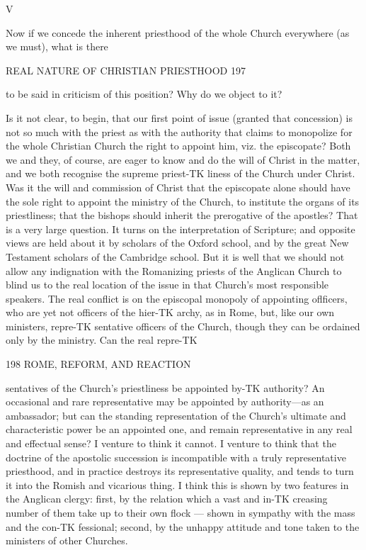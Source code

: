 \documentclass[12pt,a5paper,oneside]{book}
\begin{document}
{V 

Now if we concede the inherent priesthood of the 
whole Church everywhere (as we must), what is there 



REAL NATURE OF CHRISTIAN PRIESTHOOD 197 

to be said in criticism of this position? Why do 
we object to it? 

Is it not clear, to begin, that our first point of 
issue (granted that concession) is not so much with the 
priest as with the authority that claims to monopolize 
for the whole Christian Church the right to appoint 
him, viz. the episcopate? Both we and they, of 
course, are eager to know and do the will of Christ in 
the matter, and we both recognise the supreme priest-TK
liness of the Church under Christ. Was it the will 
and commission of Christ that the episcopate alone 
should have the sole right to appoint the ministry of 
the Church, to institute the organs of its priestliness; 
that the bishops should inherit the prerogative of the 
apostles? That is a very large question. It turns on 
the interpretation of Scripture; and opposite views 
are held about it by scholars of the Oxford school, 
and by the great New Testament scholars of the 
Cambridge school. But it is well that we should not 
allow any indignation with the Romanizing priests of 
the Anglican Church to blind us to the real location 
of the issue in that Church's most responsible speakers. 
The real conflict is on the episcopal monopoly of 
appointing oflficers, who are yet not officers of the hier-TK
archy, as in Rome, but, like our own ministers, repre-TK
sentative officers of the Church, though they can be 
ordained only by the ministry. Can the real repre-TK



198 ROME, REFORM, AND REACTION 

sentatives of the Church's priestliness be appointed by-TK
authority? An occasional and rare representative 
may be appointed by authority---as an ambassador; 
but can the standing representation of the Church's 
ultimate and characteristic power be an appointed one, 
and remain representative in any real and effectual 
sense? I venture to think it cannot. I venture to 
think that the doctrine of the apostolic succession is 
incompatible with a truly representative priesthood, 
and in practice destroys its representative quality, and 
tends to turn it into the Romish and vicarious thing. 
I think this is shown by two features in the Anglican 
clergy: first, by the relation which a vast and in-TK
creasing number of them take up to their own flock 
— shown in sympathy with the mass and the con-TK
fessional; second, by the unhappy attitude and tone 
taken to the ministers of other Churches. 

}
\end{document}
